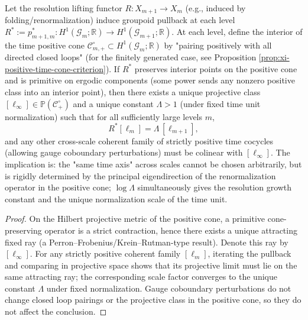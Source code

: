 \begin{theorem}\label{thm:xi-scale-coherent-time-pf-rigidity}
Let the resolution lifting functor \(R:X_{m+1}\to X_m\) (e.g., induced by folding/renormalization) induce groupoid pullback at each level
\(
R^\ast:=p_{m+1,m}^\ast:H^1(\mathcal G_m;\mathbb R)\to H^1(\mathcal G_{m+1};\mathbb R)
\).
At each level, define the interior of the time positive cone \( \mathcal C_{m,+}^\circ\subset H^1(\mathcal G_m;\mathbb R)\) by "pairing positively with all directed closed loops" (for the finitely generated case, see Proposition \ref{prop:xi-positive-time-cone-criterion}).
If \(R^\ast\) preserves interior points on the positive cone and is primitive on ergodic components (some power sends any nonzero positive class into an interior point), then there exists a unique projective class \([\ell_\infty]\in \mathbb P(\mathcal C_{+}^\circ)\) and a unique constant \(\Lambda>1\) (under fixed time unit normalization) such that for all sufficiently large levels \(m\),
\[
R^\ast[\ell_m]=\Lambda\,[\ell_{m+1}],
\]
and any other cross-scale coherent family of strictly positive time cocycles (allowing gauge coboundary perturbations) must be colinear with \([\ell_\infty]\).
The implication is: the "same time axis" across scales cannot be chosen arbitrarily, but is rigidly determined by the principal eigendirection of the renormalization operator in the positive cone; \(\log\Lambda\) simultaneously gives the resolution growth constant and the unique normalization scale of the time unit.
\end{theorem}
\begin{proof}
On the Hilbert projective metric of the positive cone, a primitive cone-preserving operator is a strict contraction, hence there exists a unique attracting fixed ray (a Perron--Frobenius/Krein--Rutman-type result).
Denote this ray by \([\ell_\infty]\).
For any strictly positive coherent family \([\ell_m]\), iterating the pullback and comparing in projective space shows that its projective limit must lie on the same attracting ray; the corresponding scale factor converges to the unique constant \(\Lambda\) under fixed normalization.
Gauge coboundary perturbations do not change closed loop pairings or the projective class in the positive cone, so they do not affect the conclusion.
\end{proof}

